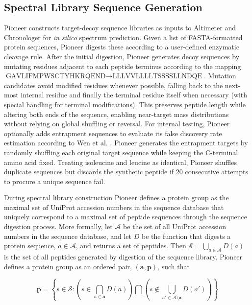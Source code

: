 \documentclass[pdflatex,sn-nature]{sn-jnl}
\begin{document}
\subsection{Spectral Library Sequence Generation}\label{subsec:spectral-library-sequence-generation}
Pioneer constructs target-decoy sequence libraries as inputs to Altimeter and Chronologer for \textit{in silico} spectrum prediction. Given a list of FASTA-formatted protein sequences, Pioneer digests these according to a user-defined enzymatic cleavage rule. After the initial digestion, Pioneer generates decoy sequences by mutating residues adjacent to each peptide terminus according to the mapping $\text{GAVLIFMPWSCTYHKRQEND} \rightarrow \text{LLLVVLLLLTSSSSLLNDQE}$. Mutation candidates avoid modified residues whenever possible, falling back to the next-most internal residue and finally the terminal residue itself when necessary (with special handling for terminal modifications). This preserves peptide length while altering both ends of the sequence, enabling near-target mass distributions without relying on global shuffling or reversal. For internal testing, Pioneer optionally adds entrapment sequences to evaluate its false discovery rate estimation according to Wen et al. \cite{Wen2024-jv}. Pioneer generates the entrapment targets by randomly shuffling each original target sequence while keeping the C-terminal amino acid fixed. Treating isoleucine and leucine as identical, Pioneer shuffles duplicate sequences but discards the synthetic peptide if 20 consecutive attempts to procure a unique sequence fail.

During spectral library construction Pioneer defines a protein group as the maximal set of UniProt accession numbers in the sequence database that uniquely correspond to a maximal set of peptide sequences through the sequence digestion process. More formally, let $\mathcal{A}$ be the set of all UniProt accession numbers in the sequence database, and let $D$ be the function that digests a protein sequence, $a \in \mathcal{A}$, and returns a set of peptides. Then $\mathcal{S} = {\bigcup_{a \in \mathcal{A}} D(a)}$ is the set of all peptides generated by digestion of the sequence library. Pioneer defines a protein group as an ordered pair, $(\mathbf{a}, \mathbf{p})$, such that

\begin{equation}
\mathbf{p} = \left\{s 
\in \mathcal{S} : \left( s \in \bigcap_{a \in \mathbf{a}} D(a)\right) \bigcap \left(s \notin \bigcup_{a' \in \mathcal{A}\setminus\mathbf{a}} D(a') \right)\right\}
\end{equation}
\end{document}
